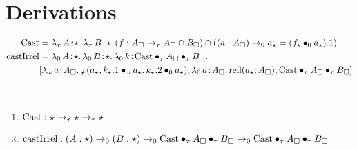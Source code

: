 \section{Derivations}

\begin{align*}
    \pCast &= \abs{\lambda_\tau}{A}{\star}{
        \abs{\lambda_\tau}{B}{\star}{
            (f : A_\square \to_\tau A_\square \cap B_\square)
            \cap ((a:A_\square) \to_0 a_\star = (\app{f_\star}{0}{a_\star}).1)
        }
    } \\
    \pcastIrrel &= \abs{\lambda_0}{A}{\star}{
        \abs{\lambda_0}{B}{\star}{
            \abs{\lambda_0}{k}{\apptwo{\pCast}{\tau}{A_\square}{\tau}{B_\square}}{
                \\ &[\abs{\lambda_\omega}{a}{A_\square}{
                    \varphi(a_\star, \app{k_\star.1}{\omega}{a_\star}, \app{k_\star.2}{0}{a_\star})
                }, \abs{\lambda_0}{a}{A_\square}{
                    \prefl(a_\star; A_\square)
                };
                \apptwo{\pCast}{\tau}{A_\square}{\tau}{B_\square}]
            }
        }
    }
\end{align*}

\begin{theorem}
    \label{lem:2:cast_derivations}
    \textcolor{white}{\_}
    \begin{enumerate}
        \item $\textnormal{Cast} : \star \to_\tau \star \to_\tau \star$
        \item $\textnormal{castIrrel} : (A:\star) \to_0 (B:\star) \to_0 \textnormal{Cast} \bullet_{\tau} A_\square \bullet_{\tau} B_\square \to_0 \textnormal{Cast} \bullet_{\tau} A_\square \bullet_{\tau} B_\square$
    \end{enumerate}
\end{theorem}

